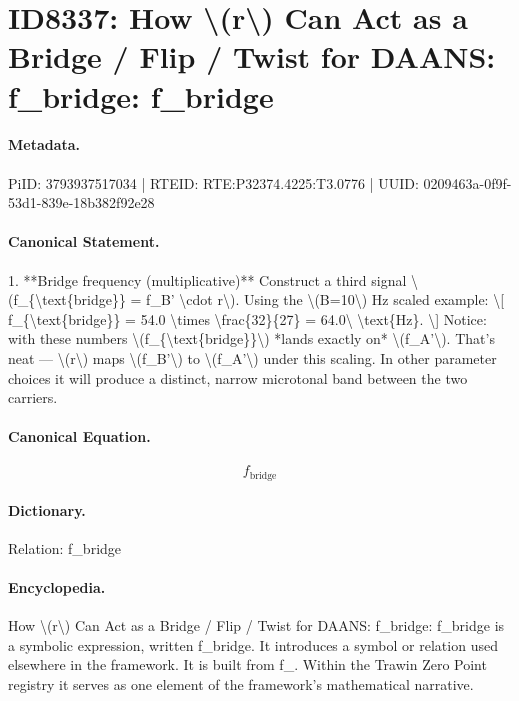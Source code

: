 \section*{ID8337: How \textbackslash{}(r\textbackslash{}) Can Act as a Bridge / Flip / Twist for DAANS: f\_bridge: f\_bridge}
\paragraph{Metadata.}
PiID: 3793937517034 | RTEID: RTE:P32374.4225:T3.0776 | UUID: 0209463a-0f9f-53d1-839e-18b382f92e28

\paragraph{Canonical Statement.}
1. **Bridge frequency (multiplicative)** Construct a third signal \textbackslash{}(f\_\{\textbackslash{}text\{bridge\}\} = f\_B' \textbackslash{}cdot r\textbackslash{}). Using the \textbackslash{}(B=10\textbackslash{}) Hz scaled example: \textbackslash{}[ f\_\{\textbackslash{}text\{bridge\}\} = 54.0 \textbackslash{}times \textbackslash{}frac\{32\}\{27\} = 64.0\textbackslash{} \textbackslash{}text\{Hz\}. \textbackslash{}] Notice: with these numbers \textbackslash{}(f\_\{\textbackslash{}text\{bridge\}\}\textbackslash{}) *lands exactly on* \textbackslash{}(f\_A'\textbackslash{}). That’s neat — \textbackslash{}(r\textbackslash{}) maps \textbackslash{}(f\_B'\textbackslash{}) to \textbackslash{}(f\_A'\textbackslash{}) under this scaling. In other parameter choices it will produce a distinct, narrow microtonal band between the two carriers.

\paragraph{Canonical Equation.}
\[
f_{\text{bridge}}
\]

\paragraph{Dictionary.}
Relation: f\_bridge

\paragraph{Encyclopedia.}
How \textbackslash{}(r\textbackslash{}) Can Act as a Bridge / Flip / Twist for DAANS: f\_bridge: f\_bridge is a symbolic expression, written f\_bridge. It introduces a symbol or relation used elsewhere in the framework. It is built from f\_. Within the Trawin Zero Point registry it serves as one element of the framework's mathematical narrative.
